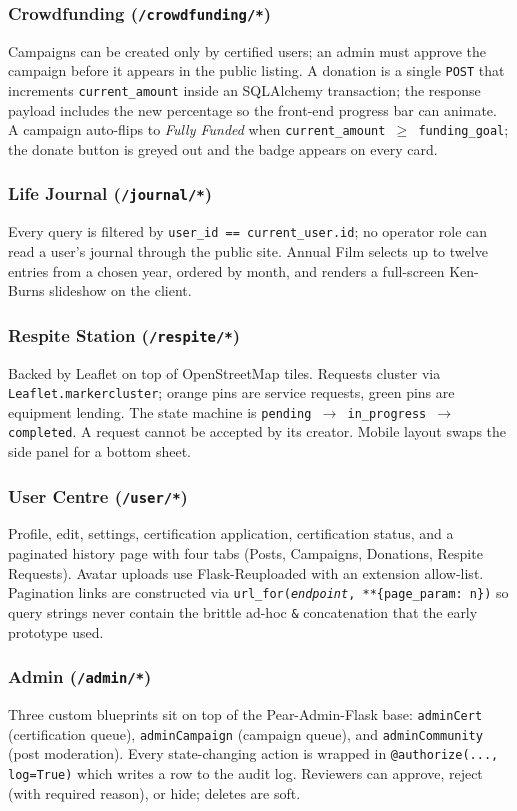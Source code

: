 \subsubsection{Crowdfunding (\texttt{/crowdfunding/*})}
Campaigns can be created only by certified users; an admin must approve
the campaign before it appears in the public listing. A donation is a
single \texttt{POST} that increments \texttt{current\_amount} inside an
SQLAlchemy transaction; the response payload includes the new percentage
so the front-end progress bar can animate. A campaign auto-flips to
\emph{Fully Funded} when \texttt{current\_amount $\geq$ funding\_goal};
the donate button is greyed out and the badge appears on every card.

\subsubsection{Life Journal (\texttt{/journal/*})}
Every query is filtered by \texttt{user\_id == current\_user.id}; no
operator role can read a user's journal through the public site.
Annual Film selects up to twelve entries from a chosen year, ordered by
month, and renders a full-screen Ken-Burns slideshow on the client.

\subsubsection{Respite Station (\texttt{/respite/*})}
Backed by Leaflet on top of OpenStreetMap tiles. Requests cluster via
\texttt{Leaflet.markercluster}; orange pins are service requests, green
pins are equipment lending. The state machine is
\texttt{pending $\to$ in\_progress $\to$ completed}. A request cannot be
accepted by its creator. Mobile layout swaps the side panel for a bottom
sheet.

\subsubsection{User Centre (\texttt{/user/*})}
Profile, edit, settings, certification application, certification
status, and a paginated history page with four tabs (Posts, Campaigns,
Donations, Respite Requests). Avatar uploads use Flask-Reuploaded with an
extension allow-list. Pagination links are constructed via
\texttt{url\_for(\textit{endpoint}, **\{page\_param: n\})} so query
strings never contain the brittle ad-hoc \texttt{\&} concatenation that
the early prototype used.

\subsubsection{Admin (\texttt{/admin/*})}
Three custom blueprints sit on top of the Pear-Admin-Flask base:
\texttt{adminCert} (certification queue), \texttt{adminCampaign}
(campaign queue), and \texttt{adminCommunity} (post moderation). Every
state-changing action is wrapped in \texttt{@authorize(..., log=True)}
which writes a row to the audit log. Reviewers can approve, reject (with
required reason), or hide; deletes are soft.

